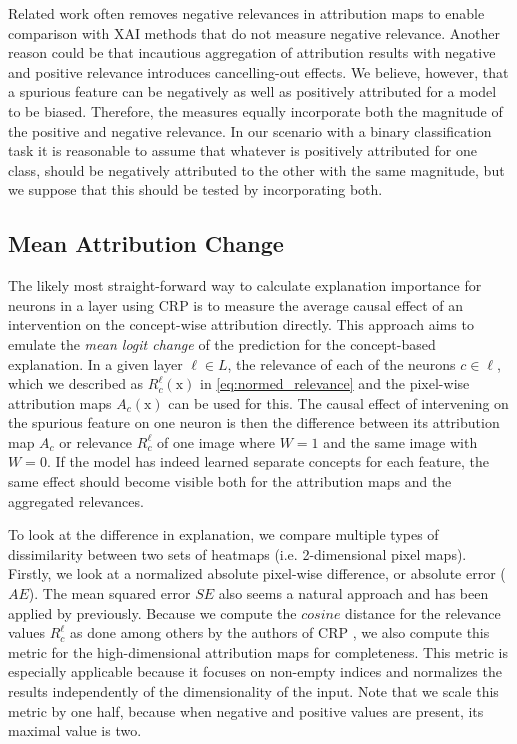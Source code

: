 Related work often removes negative relevances in attribution maps to enable comparison with XAI methods that do not measure negative relevance. Another reason could be that incautious aggregation of attribution results with negative and positive relevance introduces cancelling-out effects. We believe, however, that a spurious feature can be negatively as well as positively attributed for a model to be biased. Therefore, the measures equally incorporate both the magnitude of the positive and negative relevance. In our scenario with a binary classification task it is reasonable to assume that whatever is positively attributed for one class, should be negatively attributed to the other with the same magnitude, but we suppose that this should be tested by incorporating both.

\subsection{Mean Attribution Change}\label{section:measure_mac}
The likely most straight-forward way to calculate explanation importance for neurons in a layer using CRP is to measure the average causal effect of an intervention on the concept-wise attribution directly. This approach aims to emulate the \textit{mean logit change} of the prediction for the concept-based explanation. In a given layer $\ell \in L$, the relevance of each of the neurons $c \in \ell$, which we described as $R_c^{\ell}(\mathrm{x})$ in \cref{eq:normed_relevance} and the pixel-wise attribution maps $A_c(\mathrm{x})$ can be used for this.
The causal effect of intervening on the spurious feature on one neuron is then the difference between its attribution map $A_c$ or relevance $R_c^{\ell}$ of one image where $W=1$ and the same image with $W=0$. If the model has indeed learned separate concepts for each feature, the same effect should become visible both for the attribution maps and the aggregated relevances.

To look at the difference in explanation, we compare multiple types of dissimilarity between two sets of heatmaps (i.e. 2-dimensional pixel maps). Firstly, we look at a normalized absolute pixel-wise difference, or absolute error ($AE$). The mean squared error $SE$ also seems a natural approach and has been applied by \citet{Karimi2023} previously. Because we compute the $cosine$ distance for the relevance values $R_c^{\ell}$ as done among others by the authors of CRP \citep{Achtibat2023}, we also compute this metric for the high-dimensional attribution maps for completeness. This metric is especially applicable because it focuses on non-empty indices and normalizes the results independently of the dimensionality of the input. Note that we scale this metric by one half, because when negative and positive values are present, its maximal value is two.

